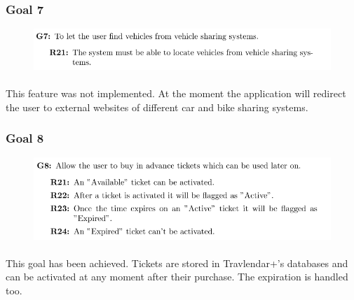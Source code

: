 \documentclass{article}
\begin{document}
			\subsubsection{Goal 7}
			\begin{figure}[H]
			\includegraphics[width=\linewidth]{Images/Goals/Goal_7.png}
			\label{fig:G7}
			\end{figure}
		\paragraph{}This feature was not implemented. At the moment the application will redirect the user to external websites of different car and bike sharing systems.
			\subsubsection{Goal 8}
			\begin{figure}[H]
			\includegraphics[width=\linewidth]{Images/Goals/Goal_8.png}
			\label{fig:G8}
			\end{figure}
		\paragraph{}This goal has been achieved. Tickets are stored in Travlendar+'s databases and can be activated at any moment after their purchase. The expiration is handled too.
\end{document}
